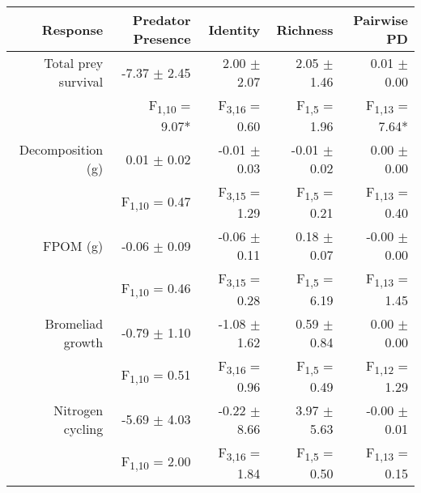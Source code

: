 \documentclass[11pt]{article}
\begin{document}
\begin{table}[h]
\begin{tabular}{rrrrr}
\toprule 
Response                & Predator Presence               & Identity                         & Richness                      & Pairwise PD             \\ 
\midrule
Total prey survival   & -7.37 $\pm$ 2.45               & 2.00 $\pm$ 2.07              & 2.05 $\pm$ 1.46              & 0.01 $\pm$ 0.00                 \\
                      & F\textsubscript{1,10} = 9.07*  & F\textsubscript{3,16} = 0.60 & F\textsubscript{1,5} = 1.96  & F\textsubscript{1,13} = 7.64*   \\
Decomposition (g)     & 0.01 $\pm$ 0.02                & -0.01 $\pm$ 0.03             & -0.01 $\pm$ 0.02             & 0.00 $\pm$ 0.00                 \\
                      & F\textsubscript{1,10} = 0.47   & F\textsubscript{3,15} = 1.29 & F\textsubscript{1,5} = 0.21  & F\textsubscript{1,13} = 0.40    \\
FPOM (g)              & -0.06 $\pm$ 0.09               & -0.06 $\pm$ 0.11             & 0.18 $\pm$ 0.07              & -0.00 $\pm$ 0.00                \\
                      & F\textsubscript{1,10} = 0.46   & F\textsubscript{3,15} = 0.28 & F\textsubscript{1,5} = 6.19  & F\textsubscript{1,13} = 1.45    \\
Bromeliad growth      & -0.79 $\pm$ 1.10               & -1.08 $\pm$ 1.62             & 0.59 $\pm$ 0.84              & 0.00 $\pm$ 0.00                 \\
                      & F\textsubscript{1,10} = 0.51   & F\textsubscript{3,16} = 0.96 & F\textsubscript{1,5} = 0.49  & F\textsubscript{1,12} = 1.29    \\
Nitrogen cycling      & -5.69 $\pm$ 4.03               & -0.22 $\pm$ 8.66             & 3.97 $\pm$ 5.63              & -0.00 $\pm$ 0.01                \\
                      & F\textsubscript{1,10} = 2.00   & F\textsubscript{3,16} = 1.84 & F\textsubscript{1,5} = 0.50  &  F\textsubscript{1,13} = 0.15   \\
\bottomrule
\end{tabular}
\bigskip{}
\\
\end{table}

\newpage{}

\end{document}
